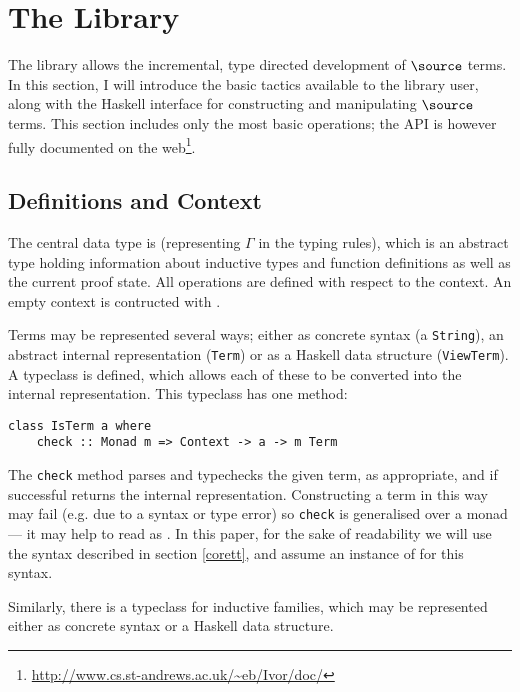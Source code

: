 \section{The \Ivor{} Library}


The \Ivor{} library allows the incremental, type directed development
of $\source$ terms.  In this section, I will introduce the basic
tactics available to the library user, along with the Haskell
interface for constructing and manipulating $\source$ terms. This
section includes only the most basic operations; the API is however
fully documented on the
web\footnote{\url{http://www.cs.st-andrews.ac.uk/~eb/Ivor/doc/}}.

\subsection{Definitions and Context}

The central data type is  (representing $\Gamma$ in the
typing rules), which is an abstract type holding information about
inductive types and function definitions as well as the current proof
state. All operations are defined with respect to the context. An
empty context is contructed with .

Terms may be represented several ways; either as concrete syntax (a
\texttt{String}), an abstract internal representation (\texttt{Term})
or as a Haskell data structure (\texttt{ViewTerm}). A typeclass
 is defined, which allows each of these to be converted
into the internal representation. This typeclass has one method:

\begin{verbatim}
class IsTerm a where
    check :: Monad m => Context -> a -> m Term
\end{verbatim}

The \texttt{check} method parses and typechecks the given term, as
appropriate, and if successful returns the internal representation.
Constructing a term in this way may fail (e.g. due to a syntax or
type error) so \texttt{check} is generalised over a monad
 --- it may help to read  as .
In this paper, for the sake of readability we will use the syntax
described in section \ref{corett}, and assume an instance of
 for this syntax.

Similarly, there is a typeclass for inductive families,
which may be represented either as concrete syntax or a Haskell data
structure.

